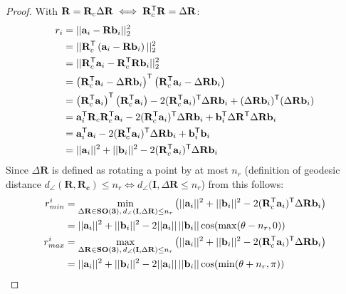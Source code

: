 \begin{proof}
	With $\mathbf{R}  = \mathbf{R}_c \Delta\mathbf{R} \iff \mathbf{R}_c^{\mathsf{T}}\mathbf{R} = \Delta \mathbf{R}$:
	\begin{equation}
		\begin{aligned}
			r_i &= ||\mathbf{a}_i - \mathbf{R}\mathbf{b}_i ||_2^2 \\
			&= || \mathbf{R}_c^{\mathsf{T}} \left(\mathbf{a}_i - \mathbf{R}\mathbf{b}_i\right) ||_2^2\\
			&= || \mathbf{R}_c^{\mathsf{T}} \mathbf{a}_i - \mathbf{R}_c^{\mathsf{T}} \mathbf{R}\mathbf{b}_i ||_2^2\\
			&= \left(\mathbf{R}_c^{\mathsf{T}} \mathbf{a}_i - \Delta \mathbf{R}\mathbf{b}_i \right)^{\mathsf{T}}
			\left(\mathbf{R}_c^{\mathsf{T}} \mathbf{a}_i - \Delta \mathbf{R}\mathbf{b}_i \right)\\ 
			&= \left(\mathbf{R}_c^{\mathsf{T}} \mathbf{a}_i \right)^{\mathsf{T}} \left(\mathbf{R}_c^{\mathsf{T}} \mathbf{a}_i \right) - 2 (\mathbf{R}_c^{\mathsf{T}}\mathbf{a}_i )^{\mathsf{T}} \Delta\mathbf{R}\mathbf{b}_i + (\Delta \mathbf{R}\mathbf{b}_i )^{\mathsf{T}} (\Delta \mathbf{R}\mathbf{b}_i )\\
			&= \mathbf{a}_i^{\mathsf{T}} \mathbf{R}_c \mathbf{R}_c^{\mathsf{T}} \mathbf{a}_i - 2 (\mathbf{R}_c^{\mathsf{T}}\mathbf{a}_i )^{\mathsf{T}} \Delta\mathbf{R}\mathbf{b}_i + \mathbf{b}_i^{\mathsf{T}}  \Delta \mathbf{R}^{\mathsf{T}}  \Delta \mathbf{R}\mathbf{b}_i\\
			&= \mathbf{a}_i^{\mathsf{T}} \mathbf{a}_i - 2 (\mathbf{R}_c^{\mathsf{T}}\mathbf{a}_i )^{\mathsf{T}} \Delta\mathbf{R}\mathbf{b}_i + \mathbf{b}_i^{\mathsf{T}} \mathbf{b}_i\\
			&= ||\mathbf{a}_i||^2 + ||\mathbf{b}_i||^2 - 2 (\mathbf{R}_c^{\mathsf{T}}\mathbf{a}_i )^{\mathsf{T}} \Delta\mathbf{R}\mathbf{b}_i
		\end{aligned}
	\end{equation}
	Since $\Delta \mathbf{R}$ is defined as rotating a point by at most $n_r$ (definition of geodesic distance $d_{\angle}(\mathbf{R}, \mathbf{R_c}) \leq n_r \iff d_{\angle}(\mathbf{I}, \Delta \mathbf{R} \leq n_r$) from this follows:
	\begin{equation}
		\begin{aligned}
			r_{min}^i &= \min_{\Delta \mathbf{R} \in \mathbf{SO(3)}, \, d_{\angle}(\mathbf{I}, \Delta \mathbf{R}) \leq n_r} \left( ||\mathbf{a}_i||^2 + ||\mathbf{b}_i||^2 - 2 (\mathbf{R}_c^{\mathsf{T}}\mathbf{a}_i )^{\mathsf{T}} \Delta\mathbf{R}\mathbf{b}_i \right)\\ 
			&= ||\mathbf{a}_i||^2 + ||\mathbf{b}_i||^2 - 2 ||\mathbf{a}_i|| \, ||\mathbf{b}_i|| \cos (\max(\theta - n_r, 0)) \\
			r_{max}^i &=
			\max_{\Delta \mathbf{R} \in \mathbf{SO(3)}, \, d_{\angle}(\mathbf{I}, \Delta \mathbf{R}) \leq n_r} \left( ||\mathbf{a}_i||^2 + ||\mathbf{b}_i||^2 - 2 (\mathbf{R}_c^{\mathsf{T}}\mathbf{a}_i )^{\mathsf{T}} \Delta\mathbf{R}\mathbf{b}_i \right)\\ 
			&=  ||\mathbf{a}_i||^2 + ||\mathbf{b}_i||^2 - 2 ||\mathbf{a}_i|| \, ||\mathbf{b}_i|| \cos (\min(\theta + n_r, \pi))
		\end{aligned}
	\end{equation}
	

\end{proof}
